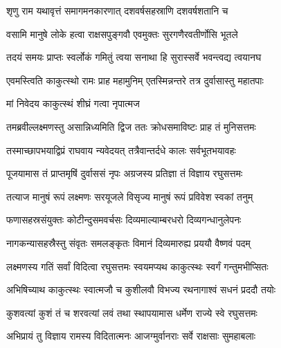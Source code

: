 
\twolineshloka
{शृणु राम यथावृत्तं समागमनकारणात्}
{दशवर्षसहस्राणि दशवर्षशतानि च}%

\twolineshloka
{वसामि मानुषे लोके हत्वा राक्षसपुङ्गवौ}
{एवमुक्तः सुरगणैरवतीर्णोसि भूतले}%

\twolineshloka
{तदयं समयः प्राप्तः स्वर्लोकं गमितुं त्वया}
{सनाथा हि सुरास्सर्वे भवन्त्वद्य त्वयानघ}%


\twolineshloka
{एवमस्त्विति काकुत्स्थो रामः प्राह महामुनिम्}
{एतस्मिन्नन्तरे तत्र दुर्वासास्तु महातपाः}%


\onelineshloka
{मां निवेदय काकुत्स्थं शीघ्रं गत्वा नृपात्मज}%


\twolineshloka
{तमब्रवील्लक्ष्मणस्तु असान्निध्यमिति द्विज}
{ततः क्रोधसमाविष्टः प्राह तं मुनिसत्तमः}%




\twolineshloka
{तस्माच्छापभयाद्विप्रं राघवाय न्यवेदयत्}
{तत्रैवान्तर्दधे कालः सर्वभूतभयावहः}%

\twolineshloka
{पूजयामास तं प्राप्तमृषिं दुर्वाससं नृपः}
{अग्रजस्य प्रतिज्ञा तं विज्ञाय रघुसत्तमः}%

\twolineshloka
{तत्याज मानुषं रूपं लक्ष्मणः सरयूजले}
{विसृज्य मानुषं रूपं प्रविवेश स्वकां तनुम्}%

\twolineshloka
{फणासहस्रसंयुक्तः कोटीन्दुसमवर्चसः}
{दिव्यमाल्याम्बरधरो दिव्यगन्धानुलेपनः}%

\twolineshloka
{नागकन्यासहस्रैस्तु संवृतः समलङ्कृतः}
{विमानं दिव्यमारुह्य प्रययौ वैष्णवं पदम्}%

\twolineshloka
{लक्ष्मणस्य गतिं सर्वां विदित्वा रघुसत्तमः}
{स्वयमप्यथ काकुत्स्थः स्वर्गं गन्तुमभीप्सितः}%

\twolineshloka
{अभिषिच्याथ काकुत्स्थः स्वात्मजौ च कुशीलवौ}
{विभज्य रथनागाश्वं सधनं प्रददौ तयोः}%

\twolineshloka
{कुशवत्यां कुशं तं च शरवत्यां लवं तथा}
{स्थापयामास धर्मेण राज्ये स्वे रघुसत्तमः}%

\twolineshloka
{अभिप्रायं तु विज्ञाय रामस्य विदितात्मनः}
{आजग्मुर्वानराः सर्वे राक्षसाः सुमहाबलाः}%

